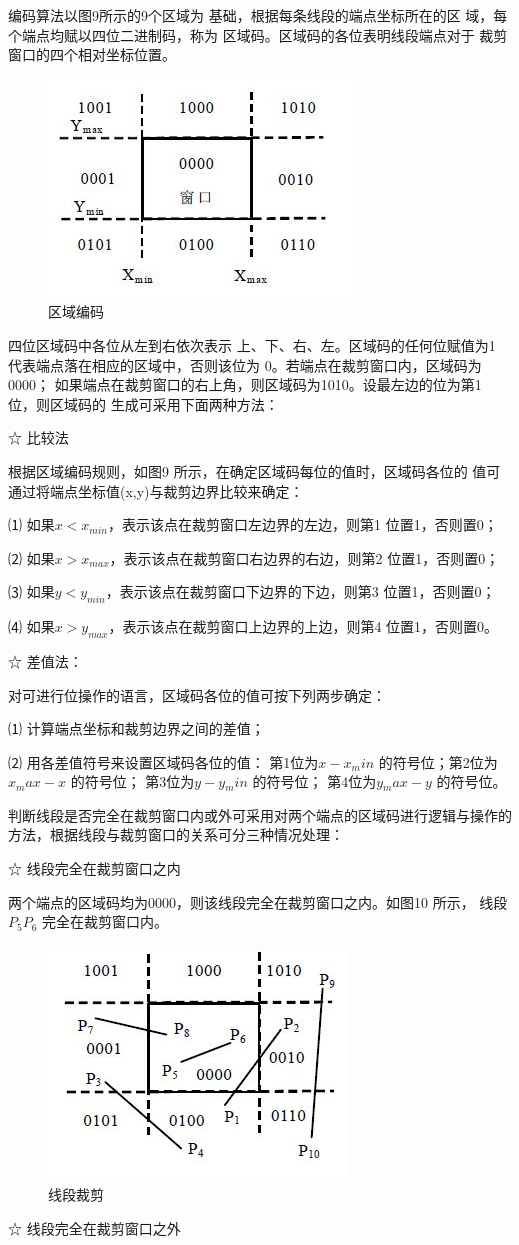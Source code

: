 \documentclass[a4paper,UTF8]{article}
\theoremstyle{definition}
\begin{document}
编码算法以图9所示的9个区域为
基础，根据每条线段的端点坐标所在的区
域，每个端点均赋以四位二进制码，称为
区域码。区域码的各位表明线段端点对于
裁剪窗口的四个相对坐标位置。
\begin{figure}[h]

    \centering
    \includegraphics[width = .2\textwidth]{3-10.jpg}
    \caption{区域编码}
    \label{fig:label9}
\end{figure}
四位区域码中各位从左到右依次表示
上、下、右、左。区域码的任何位赋值为1
代表端点落在相应的区域中，否则该位为
0。若端点在裁剪窗口内，区域码为0000；
如果端点在裁剪窗口的右上角，则区域码为1010。设最左边的位为第1 位，则区域码的
生成可采用下面两种方法：

☆ 比较法

根据区域编码规则，如图9 所示，在确定区域码每位的值时，区域码各位的
值可通过将端点坐标值(x,y)与裁剪边界比较来确定：

⑴ 如果$x<x_{min}$，表示该点在裁剪窗口左边界的左边，则第1 位置1，否则置0；

⑵ 如果$x>x_{max}$，表示该点在裁剪窗口右边界的右边，则第2 位置1，否则置0；

⑶ 如果$y<y_{min}$，表示该点在裁剪窗口下边界的下边，则第3 位置1，否则置0；

⑷ 如果$x>y_{max}$，表示该点在裁剪窗口上边界的上边，则第4 位置1，否则置0。

☆ 差值法：

对可进行位操作的语言，区域码各位的值可按下列两步确定：

⑴ 计算端点坐标和裁剪边界之间的差值；

⑵ 用各差值符号来设置区域码各位的值：
第1位为$x-x{_min}$ 的符号位；第2位为
$x{_max}-x$ 的符号位；
第3位为$y-y{_min}$ 的符号位；
第4位为$y{_max}-y$ 的符号位。

判断线段是否完全在裁剪窗口内或外可采用对两个端点的区域码进行逻辑与操作的
方法，根据线段与裁剪窗口的关系可分三种情况处理：

☆ 线段完全在裁剪窗口之内

两个端点的区域码均为0000，则该线段完全在裁剪窗口之内。如图10 所示，
线段$P_5P_6$ 完全在裁剪窗口内。
\begin{figure}[h]

    \centering
    \includegraphics[width = .2\textwidth]{3-11.jpg}
    \caption{线段裁剪}
    \label{fig:label10}
\end{figure}
☆ 线段完全在裁剪窗口之外
\end{document}
